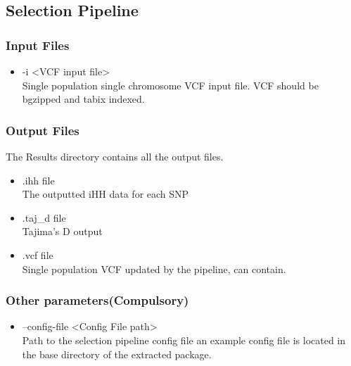 \documentclass[a4paper,10pt]{article}
\begin{document}
\subsection{Selection Pipeline}
\subsubsection{Input Files}
\begin{itemize}
\item -i <VCF input file>\\
Single population single chromosome VCF input file. VCF should be bgzipped and tabix indexed.
\end{itemize}
\subsubsection{Output Files}
The Results directory contains all the output files.
\begin{itemize}
\item .ihh file\\
The outputted iHH data for each SNP
\item .taj\_d file\\
Tajima's D output
\item .vcf file\\
Single population VCF updated by the pipeline, can contain.
\end{itemize}
\subsubsection{Other parameters(Compulsory)}
\begin{itemize}
\item --config-file <Config File path>\\
Path to the selection pipeline config file an example config file is located in the base directory of the extracted package.
\end{itemize}
\end{document}
